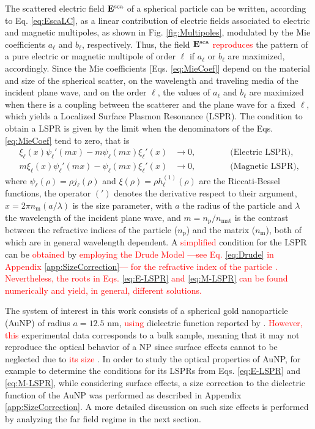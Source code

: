 The scattered electric field $\vb{E}^\text{sca}$ of a spherical particle can be written, according to Eq. \eqref{eq:EscaLC}, as a linear contribution of electric fields associated to electric and magnetic multipoles, as shown in Fig. \ref{fig:Multipoles}, modulated by the Mie coefficients $a_\ell$ and $b_\ell$, respectively. Thus, the field $\vb{E}^\text{sca}$ \textcolor{red}{reproduces} the pattern of a pure  electric or magnetic multipole of order $\ell$ if $a_\ell$ or $b_\ell$ are maximized, accordingly. Since the Mie coefficients [Eqs. \eqref{eq:MieCoef}]  depend on the material and size of the spherical scatter, on the wavelength and traveling media of the incident plane wave, and on  the order $\ell$, the values of $a_\ell$ and $b_\ell$ are maximized when there is a coupling between the scatterer and the plane wave for a fixed $\ell$, which yields a Localized Surface Plasmon Resonance (LSPR). The condition to obtain a LSPR is given by the limit when the denominators of the Eqs. \eqref{eq:MieCoef} tend to zero, that is
%
\begin{align}
 	\xi_\ell(x)\psi_\ell'(mx)-m\psi_\ell(mx)\xi_\ell'(x) &\to 0, \qquad\qquad \text{(Electric LSPR),}
 		\label{eq:E-LSPR}\\
 	m\xi_\ell(x)\psi_\ell'(mx)-\psi_\ell(mx)\xi_\ell'(x) &\to 0, \qquad\qquad \text{(Magnetic LSPR),}
 		\label{eq:M-LSPR}
\end{align}
%
where $\psi_\ell( \rho) = \rho j_\ell(\rho)$ and $\xi(\rho) = \rho h_\ell^{(1)}(\rho)$  are the Riccati-Bessel functions, the operator $(')$ denotes the derivative respect to their argument,  $x= 2\pi n_\text{m} (a/\lambda)$ is the size parameter, with $a$ the radius of the particle and $\lambda$ the wavelength of the incident plane wave, and $m =  n_\text{p} / n_\text{mat}$ is the contrast between the refractive indices of the particle ($n_\text{p}$) and the matrix ($n_\text{m}$), both of which are in general wavelength dependent. A \textcolor{red}{simplified} condition for the  LSPR can be \textcolor{red}{obtained} by \textcolor{red}{employing the Drude Model ---see Eq. \eqref{eq:Drude} in Appendix \ref{app:SizeCorrection}--- for the refractive index of the particle \cite{maciel_escudero_linear_2017}. Nevertheless, the roots in Eqs. \eqref{eq:E-LSPR} and \eqref{eq:M-LSPR} can be found numerically and yield, in general, different solutions.}

The system of interest in this work consists of a spherical gold nanoparticle (AuNP) of  radius $a = 12.5$ nm, \textcolor{red}{using} dielectric function reported by \citeauthor{johnson_optical_1972} \cite{johnson_optical_1972}.  \textcolor{red}{However, this} experimental data corresponds to a bulk sample, meaning that it may not reproduce the optical behavior of a NP since surface effects cannot to be neglected  due to \textcolor{red}{its size} \cite{noguez_surface_2007}. In order to study  the optical properties of AuNP, for example to determine the conditions for its LSPRs from   Eqs. \eqref{eq:E-LSPR}  and \eqref{eq:M-LSPR}, while considering  surface effects,  a size correction to the dielectric function of the AuNP was performed as described in Appendix \ref{app:SizeCorrection}. A more detailed discussion on such size effects is performed by analyzing the far field regime in the next section.

